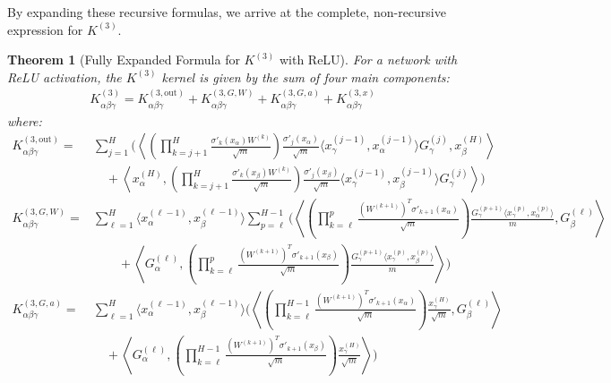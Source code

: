 \documentclass{article}
\newtheorem{theorem}{Theorem}[section]
\begin{document}
By expanding these recursive formulas, we arrive at the complete, non-recursive expression for $K^{(3)}$.

\begin{theorem}[Fully Expanded Formula for $K^{(3)}$ with ReLU]
For a network with ReLU activation, the $K^{(3)}$ kernel is given by the sum of four main components:
\begin{align}
K^{(3)}_{\alpha\beta\gamma} = K^{(3,\text{out})}_{\alpha\beta\gamma} + K^{(3,G,W)}_{\alpha\beta\gamma} + K^{(3,G,a)}_{\alpha\beta\gamma} + K^{(3,x)}_{\alpha\beta\gamma}
\end{align}
where:
\begin{align}
K^{(3,\text{out})}_{\alpha\beta\gamma} = & \sum_{j=1}^{H} \Biggl( \left\langle \left( \prod_{k=j+1}^{H} \frac{\sigma'_{k}(x_\alpha) W^{(k)}}{\sqrt{m}} \right) \frac{\sigma'_{j}(x_\alpha)}{\sqrt{m}} \langle x^{(j-1)}_\gamma, x^{(j-1)}_\alpha \rangle G^{(j)}_\gamma, x^{(H)}_\beta \right\rangle \nonumber \\
& \quad + \left\langle x^{(H)}_\alpha, \left( \prod_{k=j+1}^{H} \frac{\sigma'_{k}(x_\beta) W^{(k)}}{\sqrt{m}} \right) \frac{\sigma'_{j}(x_\beta)}{\sqrt{m}} \langle x^{(j-1)}_\gamma, x^{(j-1)}_\beta \rangle G^{(j)}_\gamma \right\rangle \Biggr) \\
K^{(3,G,W)}_{\alpha\beta\gamma} = & \sum_{\ell=1}^{H} \langle x^{(\ell-1)}_\alpha, x^{(\ell-1)}_\beta \rangle \sum_{p=\ell}^{H-1} \Biggl( \left\langle \left( \prod_{k=\ell}^{p} \frac{(W^{(k+1)})^T \sigma'_{k+1}(x_\alpha)}{\sqrt{m}} \right) \frac{G^{(p+1)}_\gamma \langle x^{(p)}_\gamma, x^{(p)}_\alpha \rangle}{m}, G^{(\ell)}_\beta \right\rangle \nonumber \\
& \qquad + \left\langle G^{(\ell)}_\alpha, \left( \prod_{k=\ell}^{p} \frac{(W^{(k+1)})^T \sigma'_{k+1}(x_\beta)}{\sqrt{m}} \right) \frac{G^{(p+1)}_\gamma \langle x^{(p)}_\gamma, x^{(p)}_\beta \rangle}{m} \right\rangle \Biggr) \\
K^{(3,G,a)}_{\alpha\beta\gamma} = & \sum_{\ell=1}^{H} \langle x^{(\ell-1)}_\alpha, x^{(\ell-1)}_\beta \rangle \Biggl( \left\langle \left( \prod_{k=\ell}^{H-1} \frac{(W^{(k+1)})^T \sigma'_{k+1}(x_\alpha)}{\sqrt{m}} \right) \frac{x^{(H)}_\gamma}{\sqrt{m}}, G^{(\ell)}_\beta \right\rangle \nonumber \\
& \quad + \left\langle G^{(\ell)}_\alpha, \left( \prod_{k=\ell}^{H-1} \frac{(W^{(k+1)})^T \sigma'_{k+1}(x_\beta)}{\sqrt{m}} \right) \frac{x^{(H)}_\gamma}{\sqrt{m}} \right\rangle \Biggr) \\

\end{align}
\end{theorem}
\end{document}
